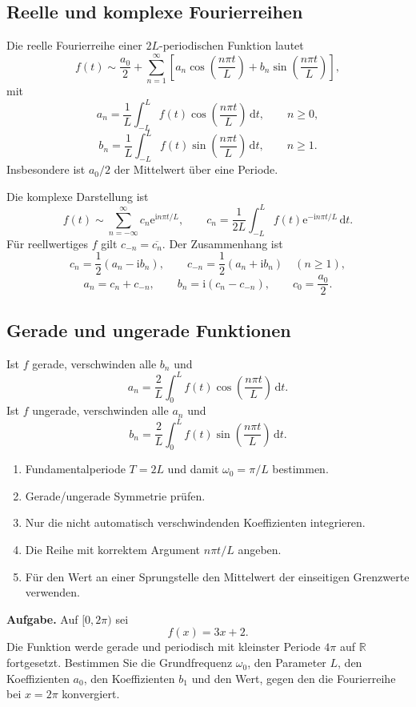 \documentclass[11pt,a4paper]{article}
\newcommand{\R}{\mathbb R}
\newcommand{\ii}{\mathrm i}
\newcommand{\ee}{\mathrm e}
\newcommand{\dd}{\,\mathrm d}
\newcommand{\1}{\mathbf 1}
\begin{document}
{\subsection{Reelle und komplexe Fourierreihen}
Die reelle Fourierreihe einer $2L$-periodischen Funktion lautet
\[
f(t)\sim\frac{a_0}{2}
+\sum_{n=1}^{\infty}
\left[
a_n\cos\!\left(\frac{n\pi t}{L}\right)
+b_n\sin\!\left(\frac{n\pi t}{L}\right)
\right],
\]
mit
\[
a_n=\frac1L\int_{-L}^{L}
f(t)\cos\!\left(\frac{n\pi t}{L}\right)\dd t,\qquad n\ge0,
\]
\[
b_n=\frac1L\int_{-L}^{L}
f(t)\sin\!\left(\frac{n\pi t}{L}\right)\dd t,\qquad n\ge1.
\]
Insbesondere ist $a_0/2$ der Mittelwert über eine Periode.

Die komplexe Darstellung ist
\[
f(t)\sim\sum_{n=-\infty}^{\infty}
c_n\ee^{\ii n\pi t/L},
\qquad
c_n=\frac1{2L}\int_{-L}^{L}
f(t)\ee^{-\ii n\pi t/L}\dd t.
\]
Für reellwertiges $f$ gilt $c_{-n}=\overline{c_n}$. Der Zusammenhang ist
\[
c_n=\frac12(a_n-\ii b_n),\qquad
c_{-n}=\frac12(a_n+\ii b_n)\quad(n\ge1),
\]
\[
a_n=c_n+c_{-n},\qquad
b_n=\ii(c_n-c_{-n}),\qquad c_0=\frac{a_0}{2}.
\]

\subsection{Gerade und ungerade Funktionen}
Ist $f$ gerade, verschwinden alle $b_n$ und
\[
a_n=\frac2L\int_0^L
f(t)\cos\!\left(\frac{n\pi t}{L}\right)\dd t.
\]
Ist $f$ ungerade, verschwinden alle $a_n$ und
\[
b_n=\frac2L\int_0^L
f(t)\sin\!\left(\frac{n\pi t}{L}\right)\dd t.
\]

\begin{kochrezeptbox}[title=Fourierreihe berechnen]
\begin{enumerate}
\item Fundamentalperiode $T=2L$ und damit $\omega_0=\pi/L$ bestimmen.
\item Gerade/ungerade Symmetrie prüfen.
\item Nur die nicht automatisch verschwindenden Koeffizienten integrieren.
\item Die Reihe mit korrektem Argument $n\pi t/L$ angeben.
\item Für den Wert an einer Sprungstelle den Mittelwert der einseitigen Grenzwerte
verwenden.
\end{enumerate}
\end{kochrezeptbox}

\begin{beispielbox}[title={Vorgerechnetes Prüfungsbeispiel: Aufgabe 11 (2024) -- Fourierreihe}]
\textbf{Aufgabe.} Auf $[0,2\pi)$ sei
\[
f(x)=3x+2.
\]
Die Funktion werde gerade und periodisch mit kleinster Periode $4\pi$ auf
$\R$ fortgesetzt. Bestimmen Sie die Grundfrequenz $\omega_0$, den Parameter
$L$, den Koeffizienten $a_0$, den Koeffizienten $b_1$ und den Wert, gegen den
die Fourierreihe bei $x=2\pi$ konvergiert.


\end{beispielbox}}
\end{document}
